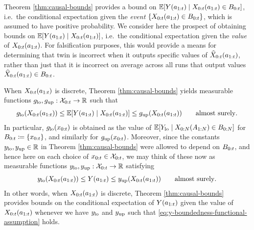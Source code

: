Theorem \ref{thm:causal-bounds} provides a bound on $\mathbb{E}[Y(a_{1:t}) \mid X_{0:t}(a_{1:t}) \in B_{0:t}]$, i.e.\ the conditional expectation given the \emph{event} $\{X_{0:t}(a_{1:t}) \in B_{0:t}\}$, which is assumed to have positive probability.
We consider here the prospect of obtaining bounds on $\mathbb{E}[Y(a_{1:t}) \mid X_{0:t}(a_{1:t})]$, i.e.\ the conditional expectation given the \emph{value} of $X_{0:t}(a_{1:t})$.
For falsification purposes, this would provide a means for determining that twin is incorrect when it outputs specific values of $\widehat{X}_{0:t}(a_{1:t})$, rather than just that it is incorrect on average across all runs that output values $\widehat{X}_{0:t}(a_{1:t}) \in B_{0:t}$.

When $X_{0:t}(a_{1:t})$ is discrete, Theorem \ref{thm:causal-bounds} yields measurable functions $g_{\mathrm{lo}}, g_{\mathrm{up}} : \mathcal{X}_{0:t} \to \mathbb{R}$ such that
\begin{equation} \label{eq:psi-lo-up-defining-property}
    g_{\mathrm{lo}}(X_{0:t}(a_{1:t}))
        \leq \mathbb{E}[Y(a_{1:t}) \mid X_{0:t}(a_{1:t})] \leq g_{\mathrm{up}}(X_{0:t}(a_{1:t})) \qquad \text{almost surely}.
\end{equation}
In particular, $g_{\mathrm{lo}}(x_{0:t})$ is obtained as the value of $\mathbb{E}[Y_{\mathrm{lo}} \mid X_{0:N}(A_{1:N}) \in B_{0:N}]$ for $B_{0:t} \coloneqq \{x_{0:t}\}$, and similarly for $g_{\mathrm{up}}(x_{0:t})$.
Moreover, since the constants $y_{\mathrm{lo}}, y_{\mathrm{up}} \in \mathbb{R}$ in Theorem \ref{thm:causal-bounds} were allowed to depend on $B_{0:t}$, and hence here on each choice of $x_{0:t} \in \mathcal{X}_{0:t}$, we may think of these now as measurable functions $y_{\mathrm{lo}}, y_{\mathrm{up}} : \mathcal{X}_{0:t} \to \mathbb{R}$ satisfying
\begin{equation} \label{eq:y-boundedness-functional-assumption}
    y_{\mathrm{lo}}(X_{0:t}(a_{1:t})) \leq Y(a_{1:t}) \leq y_{\mathrm{up}}(X_{0:t}(a_{1:t})) \qquad \text{almost surely}.
\end{equation}
In other words, when $X_{0:t}(a_{1:t})$ is discrete, Theorem \ref{thm:causal-bounds} provides bounds on the conditional expectation of $Y(a_{1:t})$ given the value of $X_{0:t}(a_{1:t})$ whenever we have $y_{\mathrm{lo}}$ and $y_{\mathrm{up}}$ such that \eqref{eq:y-boundedness-functional-assumption} holds.

